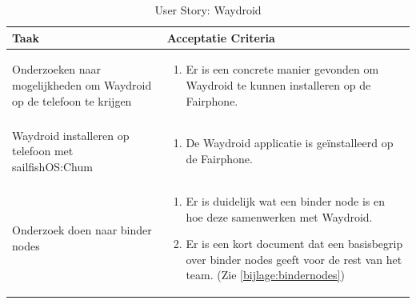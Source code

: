 \documentclass[a4paper]{report}
\newcommand{\userstorycolor}{PeachPuff1}
\begin{document}
\begin{tcolorbox}[colback=white, coltitle=black, colframe=\userstorycolor, title=\textbf{User Story: }Als developer wil ik Waydroid als package kunnen bouwen\, zodat er android apps op de telefoon gerund kunnen worden.]
  \begin{table}[H]
      \centering
    \begin{tabularx}{1\textwidth}{|X|X|}
      \hline
      \cellcolor[HTML]{ffcc99} \textbf{Taak} & \cellcolor[HTML]{ffcc99} \textbf{Acceptatie Criteria} \\ 
      \hline
      Onderzoeken naar mogelijkheden om Waydroid op de telefoon te krijgen & 
        \begin{enumerate}
          \item Er is een concrete manier gevonden om Waydroid te kunnen installeren op de Fairphone.
        \end{enumerate}
      \\
      \hline
      Waydroid installeren op telefoon met sailfishOS:Chum & 
        \begin{enumerate}
          \item De Waydroid applicatie is geïnstalleerd op de Fairphone.
        \end{enumerate}
      \\
      \hline
      Onderzoek doen naar binder nodes & 
        \begin{enumerate}
          \item Er is duidelijk wat een binder node is en hoe deze samenwerken met Waydroid. 
          \item Er is een kort document dat een basisbegrip over binder nodes geeft voor de rest van het team. (Zie \ref{bijlage:bindernodes})
        \end{enumerate}
      \\
      \hline
      
    \end{tabularx}
    \caption{User Story: Waydroid}
  \label{table:it5:story_waydroid}
  \end{table}
  \end{tcolorbox}
  
\end{document}
